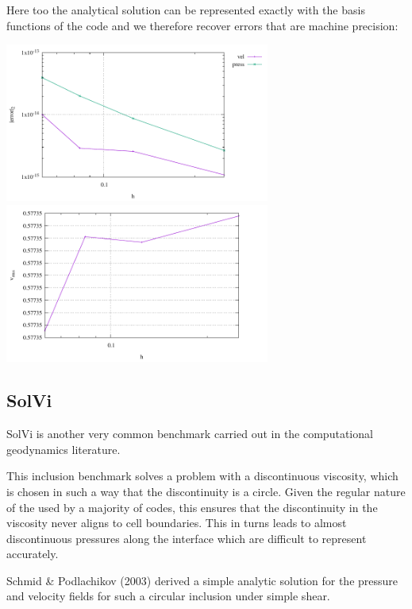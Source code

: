 \documentclass[a4paper]{article}
\begin{document}
Here too the analytical solution can be represented exactly
with the basis functions of the code
and we therefore recover errors that are machine precision:

\begin{center}
\includegraphics[width=8.7cm]{./results/benchmark_simple_shear/convergence.pdf}
\includegraphics[width=8.7cm]{./results/benchmark_simple_shear/vrms.pdf}
\end{center}



\subsection{SolVi}

SolVi is another very common benchmark carried out in the computational 
geodynamics literature.

This inclusion benchmark solves a problem with a discontinuous viscosity, 
which is chosen in such a way that the discontinuity is a circle.                
Given the regular nature of the used by a majority of codes, 
this ensures that the discontinuity in the viscosity never aligns to cell boundaries.
This in turns leads to almost discontinuous pressures along the interface which are difficult 
to represent accurately.

Schmid \& Podlachikov (2003) \cite{scpo03}
derived a simple analytic solution for the pressure and velocity fields for such a circular
inclusion under simple shear.
\end{document}
